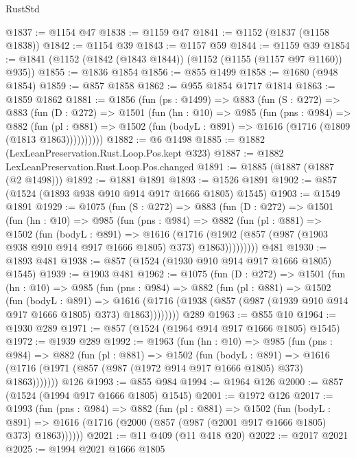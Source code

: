 \begin{lexlean}{RustStd}
\begin{coremodule}
@1837 := @1154 @47
@1838 := @1159 @47
@1841 := @1152 (@1837 (@1158 @1838))
@1842 := @1154 @39
@1843 := @1157 @59
@1844 := @1159 @39
@1854 := @1841 (@1152 (@1842 (@1843 @1844)) (@1152 (@1155 (@1157 @97 @1160)) @935))
@1855 := @1836 @1854
@1856 := @855 @1499
@1858 := @1680 (@948 @1854)
@1859 := @857 @1858
@1862 := @955 @1854 @1717 @1814
@1863 := @1859 @1862
@1881 := @1856
    (fun (ps : @1499) =>
    @883
      (fun (S : @272) =>
      @883
        (fun (D : @272) =>
        @1501
          (fun (hn : @10) =>
          @985
            (fun (pns : @984) =>
            @882
              (fun (pl : @881) =>
              @1502 (fun (bodyL : @891) => @1616 (@1716 (@1809 (@1813 @1863))))))))))
@1882 := @6 @1498
@1885 := @1882 (LexLeanPreservation.Rust.Loop.Pos.kept @323)
@1887 := @1882 LexLeanPreservation.Rust.Loop.Pos.changed
@1891 := @1885 (@1887 (@1887 (@2 @1498)))
@1892 := @1881 @1891
@1893 := @1526 @1891
@1902 := @857 (@1524 (@1893 @938 @910 @914 @917 @1666 @1805) @1545)
@1903 := @1549 @1891
@1929 := @1075
    (fun (S : @272) =>
    @883
      (fun (D : @272) =>
      @1501
        (fun (hn : @10) =>
        @985
          (fun (pns : @984) =>
          @882
            (fun (pl : @881) =>
            @1502
              (fun (bodyL : @891) =>
              @1616
                (@1716
                  (@1902 (@857 (@987 (@1903 @938 @910 @914 @917 @1666 @1805) @373) @1863)))))))))
    @481
@1930 := @1893 @481
@1938 := @857 (@1524 (@1930 @910 @914 @917 @1666 @1805) @1545)
@1939 := @1903 @481
@1962 := @1075
    (fun (D : @272) =>
    @1501
      (fun (hn : @10) =>
      @985
        (fun (pns : @984) =>
        @882
          (fun (pl : @881) =>
          @1502
            (fun (bodyL : @891) =>
            @1616 (@1716 (@1938 (@857 (@987 (@1939 @910 @914 @917 @1666 @1805) @373) @1863))))))))
    @289
@1963 := @855 @10
@1964 := @1930 @289
@1971 := @857 (@1524 (@1964 @914 @917 @1666 @1805) @1545)
@1972 := @1939 @289
@1992 := @1963
    (fun (hn : @10) =>
    @985
      (fun (pns : @984) =>
      @882
        (fun (pl : @881) =>
        @1502
          (fun (bodyL : @891) =>
          @1616 (@1716 (@1971 (@857 (@987 (@1972 @914 @917 @1666 @1805) @373) @1863)))))))
    @126
@1993 := @855 @984
@1994 := @1964 @126
@2000 := @857 (@1524 (@1994 @917 @1666 @1805) @1545)
@2001 := @1972 @126
@2017 := @1993
    (fun (pns : @984) =>
    @882
      (fun (pl : @881) =>
      @1502
        (fun (bodyL : @891) =>
        @1616 (@1716 (@2000 (@857 (@987 (@2001 @917 @1666 @1805) @373) @1863))))))
@2021 := @11 @409 (@11 @418 @20)
@2022 := @2017 @2021
@2025 := @1994 @2021 @1666 @1805

\end{coremodule}
\end{lexlean}
